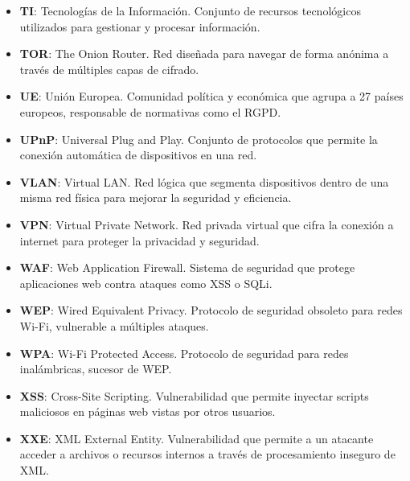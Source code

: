 \documentclass[a4paper, 11pt]{article}
\begin{document}
\begin{itemize}
    \item \textbf{TI}: Tecnologías de la Información. Conjunto de recursos tecnológicos utilizados para gestionar y procesar información.

    \item \textbf{TOR}: The Onion Router. Red diseñada para navegar de forma anónima a través de múltiples capas de cifrado.

    \item \textbf{UE}: Unión Europea. Comunidad política y económica que agrupa a 27 países europeos, responsable de normativas como el RGPD.

    \item \textbf{UPnP}: Universal Plug and Play. Conjunto de protocolos que permite la conexión automática de dispositivos en una red.

    \item \textbf{VLAN}: Virtual LAN. Red lógica que segmenta dispositivos dentro de una misma red física para mejorar la seguridad y eficiencia.

    \item \textbf{VPN}: Virtual Private Network. Red privada virtual que cifra la conexión a internet para proteger la privacidad y seguridad.

    \item \textbf{WAF}: Web Application Firewall. Sistema de seguridad que protege aplicaciones web contra ataques como XSS o SQLi.

    \item \textbf{WEP}: Wired Equivalent Privacy. Protocolo de seguridad obsoleto para redes Wi-Fi, vulnerable a múltiples ataques.

    \item \textbf{WPA}: Wi-Fi Protected Access. Protocolo de seguridad para redes inalámbricas, sucesor de WEP.

    \item \textbf{XSS}: Cross-Site Scripting. Vulnerabilidad que permite inyectar scripts maliciosos en páginas web vistas por otros usuarios.

    \item \textbf{XXE}: XML External Entity. Vulnerabilidad que permite a un atacante acceder a archivos o recursos internos a través de procesamiento inseguro de XML.
\end{itemize}
\end{document}
